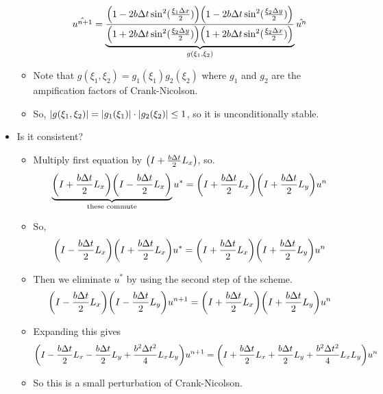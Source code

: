 \documentclass{article}
\newcommand{\Dx}{\Delta x}
\newcommand{\Dy}{\Delta y}
\newcommand{\Dt}{\Delta t}
\begin{document}
\begin{itemize}
\begin{itemize}
                \begin{align}
                    \hat{u^{n+1}} = \underbrace{\frac{\qty(1 - 2b\Dt\sin^2(\frac{\xi_1\Dx}{2}))\qty(1 - 2b\Dt\sin^2(\frac{\xi_2\Dy}{2}))}{\qty(1 + 2b\Dt\sin^2(\frac{\xi_2\Dy}{2}))\qty(1 + 2b\Dt\sin^2(\frac{\xi_2\Dx}{2}))}}_{g(\xi_1,\xi_2)}\hat{u^n}
                \end{align}
                \item Note that $g(\xi_1,\xi_2) = g_1(\xi_1)g_2(\xi_2)$ where $g_1$ and $g_2$ are the ampification factors of Crank-Nicolson.
                \item So, $\abs{g(\xi_1,\xi_2)} = \abs{g_1(\xi_1)}\cdot\abs{g_2(\xi_2)} \leq 1$, so it is unconditionally stable.
            \end{itemize}
            \item Is it consistent?
            \begin{itemize}
                \item Multiply first equation by $\qty(I + \frac{b\Dt}{2}L_x)$, so.
                \begin{align}
                    \underbrace{\qty(I + \frac{b\Dt}{2}L_x)\qty(I - \frac{b\Dt}{2}L_x)}_{\text{these commute}}u^* = \qty(I + \frac{b\Dt}{2}L_x)\qty(I + \frac{b\Dt}{2}L_y)u^n
                \end{align}
                \item So,
                \begin{align}
                    \qty(I - \frac{b\Dt}{2}L_x)\qty(I + \frac{b\Dt}{2}L_x)u^* = \qty(I + \frac{b\Dt}{2}L_x)\qty(I + \frac{b\Dt}{2}L_y)u^n
                \end{align}
                \item Then we eliminate $u^*$ by using the second step of the scheme.
                \begin{align}
                    \qty(I - \frac{b\Dt}{2}L_x)\qty(I - \frac{b\Dt}{2}L_y)u^{n+1} = \qty(I + \frac{b\Dt}{2}L_x)\qty(I + \frac{b\Dt}{2}L_y)u^n
                \end{align}
                \item Expanding this gives
                \begin{align}
                    \qty(I - \frac{b\Dt}{2}L_x - \frac{b\Dt}{2}L_y + \frac{b^2\Dt^2}{4}L_xL_y)u^{n+1} = \qty(I + \frac{b\Dt}{2}L_x + \frac{b\Dt}{2}L_y + \frac{b^2\Dt^2}{4}L_xL_y)u^n
                \end{align}
                \item So this is a small perturbation of Crank-Nicolson.

\end{itemize}
\end{itemize}
\end{document}
